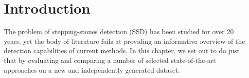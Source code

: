 






\section{Introduction}\label{SecN:Introduction}


The problem of stepping-stones detection (SSD) has been studied for over 20 years, yet the body of literature fails at providing an informative overview of the detection capabilities of current methods. In this chapter, we set out to do just that by evaluating and comparing a number of selected state-of-the-art approaches on a new and independently generated dataset.


